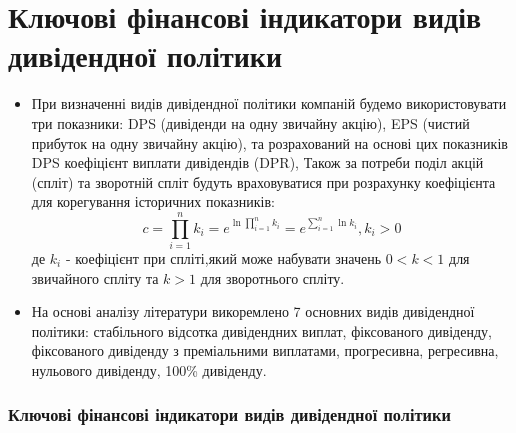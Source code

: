\documentclass[aspectratio=169]{beamer}
\begin{document}
\section{Ключові фінансові індикатори видів дивідендної політики}
\begin{frame}
\begin{itemize}
\item При визначенні видів дивідендної політики компаній будемо використовувати три показники: \alert {DPS} (дивіденди на одну звичайну акцію), \alert {EPS} (чистий прибуток на одну звичайну акцію), та розрахований на основі цих показників \alert {DPS} коефіцієнт виплати дивідендів (DPR), Також за потреби поділ акцій (спліт) та зворотній спліт будуть враховуватися при розрахунку \alert {коефіцієнта для корегування історичних показників}:
\[c=\prod_{i=1}^{n}k_{i}=e^{\ln\prod_{i=1}^{n}k_{i}}=e^{\sum_{i=1}^{n}\ln k_{i}}, k_{i}>0\]
де $k_{i}$ - коефіцієнт при спліті,який може набувати значень $0<k<1$  для звичайного спліту та $k>1$ для зворотнього спліту.
\smallskip
\item На основі аналізу літератури викоремлено 7 основних \alert {видів
дивідендної політики}: стабільного відсотка дивідендних виплат, фіксованого дивіденду, фіксованого дивіденду з преміальними виплатами, прогресивна, регресивна, нульового дивіденду, 100\% дивіденду.
\end{itemize}
\frametitle{Ключові фінансові індикатори видів дивідендної політики}
\end{frame}
\end{document}
